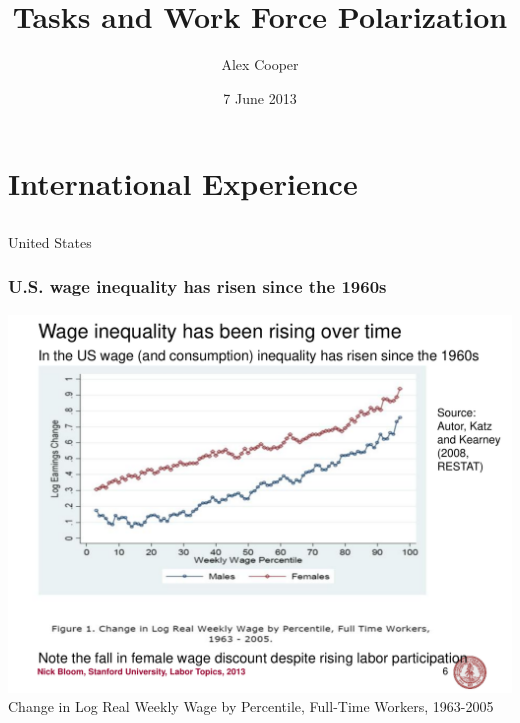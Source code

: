 \documentclass[red]{beamer}
\title[Polarization and Tasks]{Tasks and Work Force Polarization}
\author{Alex Cooper}
\date{7 June 2013}
\begin{document}
%
\begin{frame}
\titlepage
\end{frame}
%
\section{International Experience}
\subsection{}

\begin{frame}[t]{United States}
\frametitle{U.S. wage inequality has risen since the 1960s}
\begin{center}
  \includegraphics[width=\textwidth]{slides_fig/katz_kearney_2008_log_e_chg.pdf}
  \\
  Change in Log Real Weekly Wage by Percentile, Full-Time Workers, 1963-2005
  \citep{Autor2008}
\end{center}
\end{frame}
\end{document}
